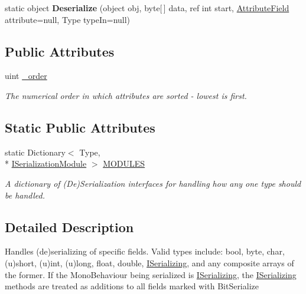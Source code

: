 \begin{DoxyCompactItemize}
\item 
\hypertarget{class_skyrates_1_1_common_1_1_network_1_1_bit_serialize_attribute_abf2e82a6048d0e24b4ba2b2637d5e6ad}{static object {\bfseries Deserialize} (object obj, byte\mbox{[}$\,$\mbox{]} data, ref int start, \hyperlink{class_skyrates_1_1_common_1_1_network_1_1_bit_serialize_attribute_1_1_attribute_field}{Attribute\-Field} attribute=null, Type type\-In=null)}\label{class_skyrates_1_1_common_1_1_network_1_1_bit_serialize_attribute_abf2e82a6048d0e24b4ba2b2637d5e6ad}

\end{DoxyCompactItemize}
\subsection*{Public Attributes}
\begin{DoxyCompactItemize}
\item 
uint \hyperlink{class_skyrates_1_1_common_1_1_network_1_1_bit_serialize_attribute_afad634aa4c413a98c22d0b26d7dad8a6}{\-\_\-order}
\begin{DoxyCompactList}\small\item\em The numerical order in which attributes are sorted -\/ lowest is first. \end{DoxyCompactList}\end{DoxyCompactItemize}
\subsection*{Static Public Attributes}
\begin{DoxyCompactItemize}
\item 
static Dictionary$<$ Type, \\*
\hyperlink{interface_skyrates_1_1_common_1_1_network_1_1_bit_serialize_attribute_1_1_i_serialization_module}{I\-Serialization\-Module} $>$ \hyperlink{class_skyrates_1_1_common_1_1_network_1_1_bit_serialize_attribute_a5804be2d376111418f81ec041b5ddf80}{M\-O\-D\-U\-L\-E\-S}
\begin{DoxyCompactList}\small\item\em A dictionary of (De)Serialization interfaces for handling how any one type should be handled. \end{DoxyCompactList}\end{DoxyCompactItemize}


\subsection{Detailed Description}
Handles (de)serializing of specific fields. Valid types include\-: bool, byte, char, (u)short, (u)int, (u)long, float, double, \hyperlink{interface_skyrates_1_1_common_1_1_network_1_1_i_serializing}{I\-Serializing}, and any composite arrays of the former. If the Mono\-Behaviour being serialized is \hyperlink{interface_skyrates_1_1_common_1_1_network_1_1_i_serializing}{I\-Serializing}, the \hyperlink{interface_skyrates_1_1_common_1_1_network_1_1_i_serializing}{I\-Serializing} methods are treated as additions to all fields marked with Bit\-Serialize 



